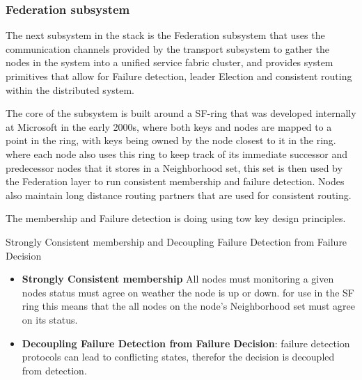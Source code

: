 \documentclass[a4paper,10pt,titlepage]{report}
\begin{document}
\subsubsection{Federation subsystem}

The next subsystem in the stack is the Federation subsystem that uses the communication channels provided by the transport subsystem to gather the nodes in the system into a unified service fabric cluster, and provides system primitives that allow for Failure detection, leader Election and consistent routing within the distributed system.\\
\vspace{5mm}

The core of the subsystem is built around a SF-ring that was developed internally at Microsoft in the early 2000s, where both keys and nodes are mapped to a point in the ring, with keys being owned by the node closest to it in the ring. where each node also uses this ring to keep track of its immediate successor and predecessor nodes that it stores in a Neighborhood set, this set is then used by the Federation layer to run consistent membership and failure detection. Nodes also maintain long distance routing partners that are used for consistent routing.\\
\vspace{5mm}

The membership and Failure detection is doing using tow key design principles.\\
\vspace{5mm}

Strongly Consistent membership and Decoupling Failure Detection from Failure Decision\\
\vspace{5mm}

\begin{itemize}
    \item \textbf{Strongly Consistent membership} All nodes must monitoring a given nodes status must agree on weather the node is up or down. for use in the SF ring this means that the all nodes on the node's Neighborhood set must agree on its status.
    \item \textbf{Decoupling Failure Detection from Failure Decision}: failure detection protocols can lead to conflicting states, therefor the decision is decoupled from detection.
\end{itemize}
\vspace{5mm}
\end{document}
